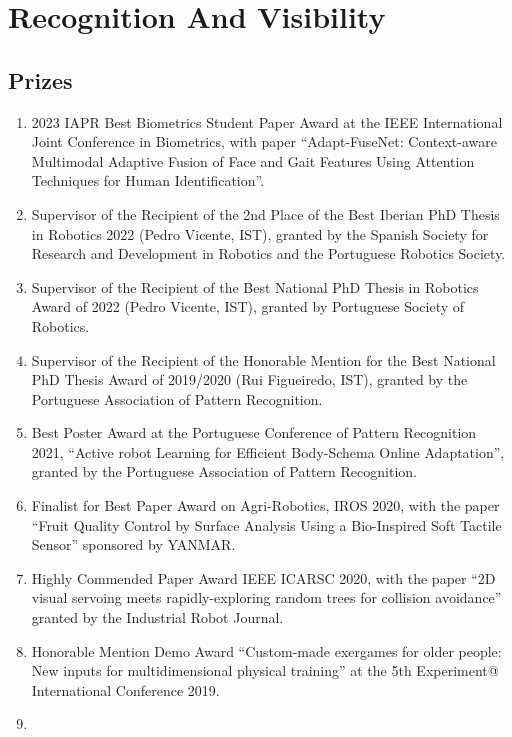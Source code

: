 \section{Recognition And Visibility}\label{recognition-and-visibility-1}

\subsection{Prizes}\label{prizes}

\begin{enumerate}
\def\labelenumi{\arabic{enumi}.}
\item
  2023 IAPR Best Biometrics Student Paper Award at the IEEE
  International Joint Conference in Biometrics, with paper
  ``Adapt-FuseNet: Context-aware Multimodal Adaptive Fusion of Face and
  Gait Features Using Attention Techniques for Human Identification''.
\item
  Supervisor of the Recipient of the 2nd Place of the Best Iberian PhD
  Thesis in Robotics 2022 (Pedro Vicente, IST), granted by the Spanish
  Society for Research and Development in Robotics and the Portuguese
  Robotics Society.
\item
  Supervisor of the Recipient of the Best National PhD Thesis in
  Robotics Award of 2022 (Pedro Vicente, IST), granted by Portuguese
  Society of Robotics.
\item
  Supervisor of the Recipient of the Honorable Mention for the Best
  National PhD Thesis Award of 2019/2020 (Rui Figueiredo, IST), granted
  by the Portuguese Association of Pattern Recognition.
\item
  Best Poster Award at the Portuguese Conference of Pattern Recognition
  2021, ``Active robot Learning for Efficient Body-Schema Online
  Adaptation'', granted by the Portuguese Association of Pattern
  Recognition.
\item
  Finalist for Best Paper Award on Agri-Robotics, IROS 2020, with the
  paper ``Fruit Quality Control by Surface Analysis Using a Bio-Inspired
  Soft Tactile Sensor'' sponsored by YANMAR.
\item
  Highly Commended Paper Award IEEE ICARSC 2020, with the paper ``2D
  visual servoing meets rapidly-exploring random trees for collision
  avoidance'' granted by the Industrial Robot Journal.
\item
  Honorable Mention Demo Award ``Custom-made exergames for older people:
  New inputs for multidimensional physical training'' at the 5th
  Experiment@ International Conference 2019.
\item

\end{enumerate}
